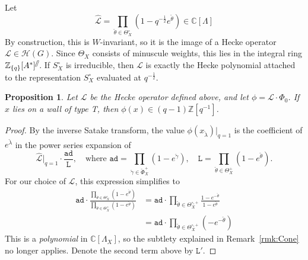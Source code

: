 \documentclass{amsart}
\newtheorem{prop}[theorem]{Proposition}
\theoremstyle{definition}
\theoremstyle{remark}
\newcommand{\1}{\mathbf{1}}
\newcommand{\C}{\mathbb{C}}
\newcommand{\sh}[1]{\mathcal{#1}}
\newcommand{\Z}{\mathbb{Z}}
\theoremstyle{definition}
\newcommand{\shear}{{\mathbin{\mkern-6mu\fatslash}}}
\begin{document}
Let
\[
  \hat{\sh{L}}=\prod_{\check{\theta}\in\Theta_X^\circ}(1-q^{-\frac{1}{2}}e^{\check{\theta}})\in\C[\Lambda]
\]
By construction, this is $W$-invariant, so it is the image of a Hecke operator $\sh{L}\in\sh{H}(G)$. Since $\Theta_X$ consists of minuscule weights, this lies in the integral ring $\Z_{\{q\}}[A^*]^\shear$. If $S_X^\circ$ is irreducible, then $\sh{L}$ is exactly the Hecke polynomial attached to the representation $S_X^\circ$ evaluated at $q^{-\frac{1}{2}}$.
\begin{prop}\label{prop:DivisibleT}
  Let $\sh{L}$ be the Hecke operator defined above, and let $\phi=\sh{L}\cdot\Phi_0$. If $x$ lies on a wall of type T, then $\phi(x)\in (q-1)\Z[q^{-1}]$.
\end{prop}
\begin{proof}
  By the inverse Satake transform, the value $\phi(x_{\check\lambda})|_{q=1}$ is the coefficient of $e^{\check\lambda}$ in the power series expansion of
  \[
    \hat{\sh{L}}|_{q=1}\cdot\frac{\mathtt{ad}}{\mathtt{L}},\quad\text{where }\mathtt{ad}=\prod_{\check\gamma\in\check\Phi_X^+}(1-e^{\check\gamma}),\quad\mathtt{L}=\prod_{\check\theta\in\Theta_X^+}(1-e^{\check\theta}).
  \]
  For our choice of $\sh{L}$, this expression simplifies to
  \begin{align*}
    \mathtt{ad}\cdot\frac{\prod_{\check{\theta}\in\Theta_X^\circ}(1-e^{\check{\theta}})}{\prod_{\check\theta\in\Theta_X^+}(1-e^{\check\theta})}&=\mathtt{ad}\cdot\prod_{\check{\theta}\in\Theta_X^{\circ,+}}\frac{1-e^{-\check{\theta}}}{1-e^{\check{\theta}}}\\
    &=\mathtt{ad}\cdot\prod_{\check{\theta}\in\Theta_X^{\circ,+}}(-e^{-\check{\theta}})
  \end{align*}
  This is a \emph{polynomial} in $\C[\Lambda_X]$, so the subtlety explained in Remark~\ref{rmk:Cone} no longer applies. Denote the second term above by $\mathtt{L}'$.
  

\end{proof}
\end{document}
